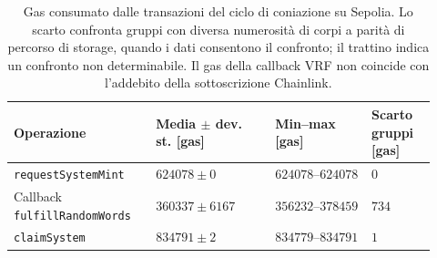 \begin{table}[htbp]
\centering
\small
\setlength{\tabcolsep}{3pt}
\begin{tabular}{p{0.31\linewidth}p{0.26\linewidth}p{0.21\linewidth}p{0.14\linewidth}}
\toprule
\textbf{Operazione} & \textbf{Media $\pm$ dev. st. [gas]} & \textbf{Min--max [gas]} & \textbf{Scarto gruppi [gas]} \\
\midrule
\texttt{requestSystemMint} & $624078 \pm 0$ & $624078$--$624078$ & $0$ \\
Callback \texttt{fulfillRandomWords} & $360337 \pm 6167$ & $356232$--$378459$ & $734$ \\
\texttt{claimSystem} & $834791 \pm 2$ & $834779$--$834791$ & $1$ \\
\bottomrule
\end{tabular}
\caption{Gas consumato dalle transazioni del ciclo di coniazione su Sepolia. Lo scarto confronta gruppi con diversa numerosità di corpi a parità di percorso di storage, quando i dati consentono il confronto; il trattino indica un confronto non determinabile. Il gas della callback VRF non coincide con l'addebito della sottoscrizione Chainlink.}
\label{tab:eval-gas}
\end{table}

